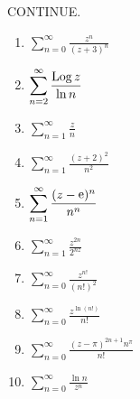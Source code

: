 {\begin{Solution}
  \label{solution convergence zn / (z+3)n}
  CONTINUE.
  \begin{enumerate}
  \item
    $\displaystyle \sum_{n=0}^\infty \frac{z^n}{(z+3)^n}$
  \item
    $\displaystyle \sum_{n=2}^\infty \frac{\mathop{\mathrm{Log}}\nolimits z}{\ln n}$
  \item
    $\displaystyle \sum_{n=1}^\infty \frac{z}{n}$
  \item
    $\displaystyle \sum_{n=1}^\infty \frac{(z+2)^2}{n^2}$
  \item
    $\displaystyle \sum_{n=1}^\infty \frac{(z - \mathop{\mathrm{e}}\nolimits)^n}{n^n}$
  \item
    $\displaystyle \sum_{n=1}^\infty \frac{z^{2 n}}{2^{n z}}$
  \item
    $\displaystyle \sum_{n=0}^\infty \frac{z^{n!}}{(n!)^2}$
  \item
    $\displaystyle \sum_{n=0}^\infty \frac{z^{\ln(n!)}}{n!}$
  \item
    $\displaystyle \sum_{n=0}^\infty \frac{ (z - \pi)^{2 n + 1} n^\pi }{ n! }$
  \item
    $\displaystyle \sum_{n=0}^\infty \frac{ \ln n }{ z^n }$
  \end{enumerate}
\end{Solution}


}
